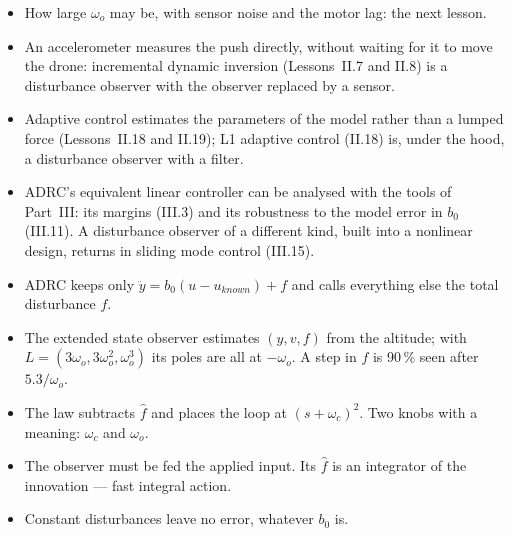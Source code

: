 \begin{lookahead}
\begin{itemize}[leftmargin=1.2em]
  \item How large $\omega_o$ may be, with sensor noise and the motor lag: the next lesson.
  \item An accelerometer measures the push directly, without waiting for it to move the drone: incremental dynamic inversion (Lessons~II.7 and II.8) is a disturbance observer with the observer replaced by a sensor.
  \item Adaptive control estimates the parameters of the model rather than a lumped force (Lessons~II.18 and II.19); L1 adaptive control (II.18) is, under the hood, a disturbance observer with a filter.
  \item ADRC's equivalent linear controller can be analysed with the tools of Part~III: its margins (III.3) and its robustness to the model error in $b_0$ (III.11). A disturbance observer of a different kind, built into a nonlinear design, returns in sliding mode control (III.15).
\end{itemize}
\end{lookahead}

\begin{remember}
\begin{itemize}
  \item ADRC keeps only $\ddot y = b_0(u - u_{known}) + f$ and calls everything else the total disturbance $f$.
  \item The extended state observer estimates $(y, v, f)$ from the altitude; with $L = (3\omega_o, 3\omega_o^2, \omega_o^3)$ its poles are all at $-\omega_o$. A step in $f$ is 90\,\% seen after $5.3/\omega_o$.
  \item The law subtracts $\hat f$ and places the loop at $(s + \omega_c)^2$. Two knobs with a meaning: $\omega_c$ and $\omega_o$.
  \item The observer must be fed the applied input. Its $\hat f$ is an integrator of the innovation — fast integral action.
  \item Constant disturbances leave no error, whatever $b_0$ is.
\end{itemize}
\end{remember}

